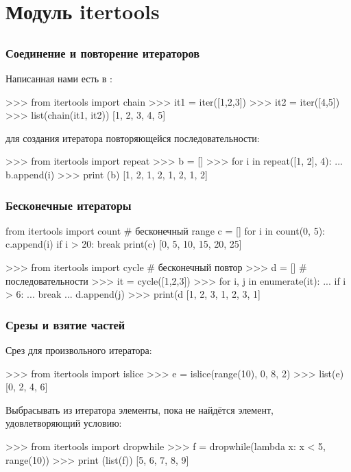 \documentclass[fleqn, xcolor=x11names]{beamer}
\begin{document}
\section{Модуль itertools}
\subsection*{}

\begin{frame}[fragile]\frametitle{Соединение и повторение итераторов}
Написанная нами  есть в :
\begin{pcode}
>>> from itertools import chain
>>> it1 = iter([1,2,3])
>>> it2 = iter([4,5])
>>> list(chain(it1, it2))
[1, 2, 3, 4, 5]
\end{pcode}

 для создания итератора повторяющейся последовательности:
\begin{pcode}
>>> from itertools import repeat
>>> b = []
>>> for i in repeat([1, 2], 4):
...     b.append(i)
>>> print (b)
[1, 2, 1, 2, 1, 2, 1, 2]
\end{pcode}
\end{frame}

\begin{frame}[fragile]\frametitle{Бесконечные итераторы}

\begin{pcode}
from itertools import count # бесконечный range
c = []
for i in count(0, 5):
    c.append(i)
    if i > 20:
        break
print(c)
[0, 5, 10, 15, 20, 25]
\end{pcode}

\begin{pcode}
>>> from itertools import cycle # бесконечный повтор 
>>> d = []                      # последовательности
>>> it = cycle([1,2,3])
>>> for i, j in enumerate(it):
...     if i > 6:
...         break
...     d.append(j)
>>> print(d
[1, 2, 3, 1, 2, 3, 1]
\end{pcode}
\end{frame}

\begin{frame}[fragile]\frametitle{Срезы и взятие частей}
Срез для произвольного итератора:
\begin{pcode}
>>> from itertools import islice  
>>> e = islice(range(10), 0, 8, 2) 
>>> list(e)
[0, 2, 4, 6]
\end{pcode}

\hfill

Выбрасывать из итератора элементы, пока не найдётся элемент, удовлетворяющий условию:
\begin{pcode}
>>> from itertools import dropwhile
>>> f = dropwhile(lambda x: x < 5, range(10))
>>> print (list(f))
[5, 6, 7, 8, 9]
\end{pcode}

\end{frame}
\end{document}
